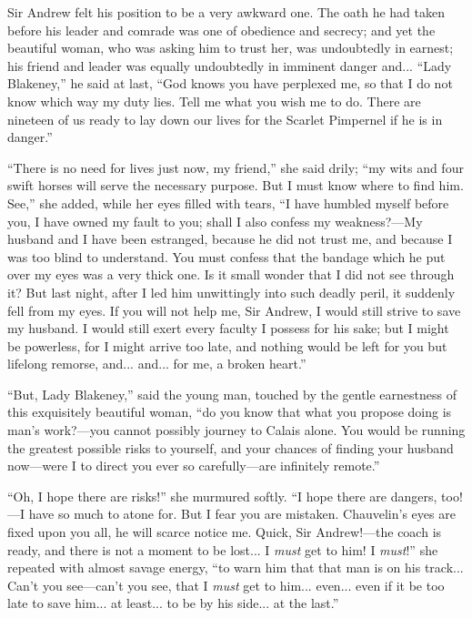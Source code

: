 \documentclass[paper=5.5in:8.5in,BCOR=7mm,twoside,DIV=calc,12pt,usegeometry,chapterprefix,endperiod,headings=big]{scrbook}
\begin{document}
Sir Andrew felt his position to be a very awkward one. The oath he had taken before his leader and comrade was one of obedience and secrecy; and yet the beautiful woman, who was asking him to trust her, was undoubtedly in earnest; his friend and leader was equally undoubtedly in imminent danger and... \enquote{Lady Blakeney,} he said at last, \enquote{God knows you have perplexed me, so that I do not know which way my duty lies. Tell me what you wish me to do. There are nineteen of us ready to lay down our lives for the Scarlet Pimpernel if he is in danger.}

\enquote{There is no need for lives just now, my friend,} she said drily; \enquote{my wits and four swift horses will serve the necessary purpose. But I must know where to find him. See,} she added, while her eyes filled with tears, \enquote{I have humbled myself before you, I have owned my fault to you; shall I also confess my weakness?---My husband and I have been estranged, because he did not trust me, and because I was too blind to understand. You must confess that the bandage which he put over my eyes was a very thick one. Is it small wonder that I did not see through it? But last night, after I led him unwittingly into such deadly peril, it suddenly fell from my eyes. If you will not help me, Sir Andrew, I would still strive to save my husband. I would still exert every faculty I possess for his sake; but I might be powerless, for I might arrive too late, and nothing would be left for you but lifelong remorse, and... and... for me, a broken heart.}

\enquote{But, Lady Blakeney,} said the young man, touched by the gentle earnestness of this exquisitely beautiful woman, \enquote{do you know that what you propose doing is man's work?---you cannot possibly journey to Calais alone. You would be running the greatest possible risks to yourself, and your chances of finding your husband now---were I to direct you ever so carefully---are infinitely remote.}

\enquote{Oh, I hope there are risks!} she murmured softly. \enquote{I hope there are dangers, too!---I have so much to atone for. But I fear you are mistaken. Chauvelin's eyes are fixed upon you all, he will scarce notice me. Quick, Sir Andrew!---the coach is ready, and there is not a moment to be lost... I \textit{must} get to him! I \textit{must}!} she repeated with almost savage energy, \enquote{to warn him that that man is on his track... Can't you see---can't you see, that I \textit{must} get to him... even... even if it be too late to save him... at least... to be by his side... at the last.}
\end{document}
